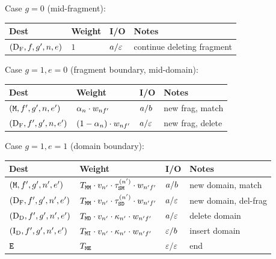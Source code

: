 \medskip
\noindent Case $g=0$ (mid-fragment):
\begin{center}
\renewcommand{\arraystretch}{1.3}
\begin{tabular}{llll}
\hline
Dest & Weight & I/O & Notes \\
\hline
$(\mathrm{D_F}, f, g', n, e)$ &
  $1$ &
  $a / \varepsilon$ &
  continue deleting fragment \\
\hline
\end{tabular}
\end{center}

\noindent Case $g=1, e=0$ (fragment boundary, mid-domain):
\begin{center}
\renewcommand{\arraystretch}{1.3}
\begin{tabular}{llll}
\hline
Dest & Weight & I/O & Notes \\
\hline
$({\tt M}, f', g', n, e')$ &
  $\alpha_n \cdot w_{nf'}$ &
  $a / b$ &
  new frag, match \\
$(\mathrm{D_F}, f', g', n, e')$ &
  $(1-\alpha_n) \cdot w_{nf'}$ &
  $a / \varepsilon$ &
  new frag, delete \\
\hline
\end{tabular}
\end{center}

\noindent Case $g=1, e=1$ (domain boundary):
\begin{center}
\renewcommand{\arraystretch}{1.3}
\begin{tabular}{llll}
\hline
Dest & Weight & I/O & Notes \\
\hline
$({\tt M}, f', g', n', e')$ &
  $T_{{\tt M}{\tt M}} \cdot v_{n'} \cdot
   \tau^{(n')}_{{\tt S}{\tt M}} \cdot w_{n'f'}$ &
  $a / b$ &
  new domain, match \\
$(\mathrm{D_F}, f', g', n', e')$ &
  $T_{{\tt M}{\tt M}} \cdot v_{n'} \cdot
   \tau^{(n')}_{{\tt S}{\tt D}} \cdot w_{n'f'}$ &
  $a / \varepsilon$ &
  new domain, del-frag \\
$(\mathrm{D_D}, f', g', n', e')$ &
  $T_{{\tt M}{\tt D}} \cdot v_{n'} \cdot
   \kappa_{n'} \cdot w_{n'f'}$ &
  $a / \varepsilon$ &
  delete domain \\
$(\mathrm{I_D}, f', g', n', e')$ &
  $T_{{\tt M}{\tt I}} \cdot v_{n'} \cdot
   \kappa_{n'} \cdot w_{n'f'}$ &
  $\varepsilon / b$ &
  insert domain \\
${\tt E}$ &
  $T_{{\tt M}{\tt E}}$ &
  $\varepsilon / \varepsilon$ &
  end \\
\hline
\end{tabular}
\end{center}

